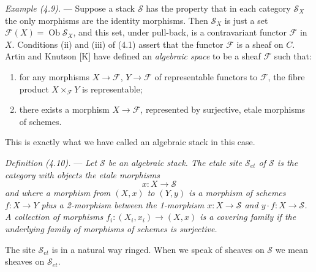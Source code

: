\documentclass[10pt]{article}
\begin{document}
\medskip
\noindent\emph{Example (4.9).} --- Suppose a stack $\mathscr S$ has the property that in each category $\mathscr S_X$ the only morphisms are the identity morphisms. Then $\mathscr S_X$ is just a set $\mathscr F(X)=\operatorname{Ob}\mathscr S_X$, and this set, under pull-back, is a contravariant functor $\mathscr F$ in $X$. Conditions (ii) and (iii) of (4.1) assert that the functor $\mathscr F$ is a sheaf on $C$. Artin and Knutson [K] have defined an \emph{algebraic space} to be a sheaf $\mathscr F$ such that:
\begin{enumerate}[label=(\roman*)]
\item for any morphisms $X\to\mathscr F$, $Y\to\mathscr F$ of representable functors to $\mathscr F$, the fibre product $X\times_{\mathscr F}Y$ is representable;
\item there exists a morphism $X\to\mathscr F$, represented by surjective, etale morphisms of schemes.
\end{enumerate}
This is exactly what we have called an algebraic stack in this case.

\medskip
\noindent\emph{Definition (4.10).} --- \emph{Let $\mathscr S$ be an algebraic stack. The etale site $\mathscr S_{et}$ of $\mathscr S$ is the category with objects the etale morphisms}
\[
x:X\to\mathscr S
\]
\emph{and where a morphism from $(X,x)$ to $(Y,y)$ is a morphism of schemes $f:X\to Y$ plus a 2-morphism between the 1-morphism $x:X\to\mathscr S$ and $y\cdot f:X\to\mathscr S$. A collection of morphisms $f_i:(X_i,x_i)\to(X,x)$ is a covering family if the underlying family of morphisms of schemes is surjective.}

The site $\mathscr S_{et}$ is in a natural way ringed. When we speak of sheaves on $\mathscr S$ we mean sheaves on $\mathscr S_{et}$.
\end{document}
